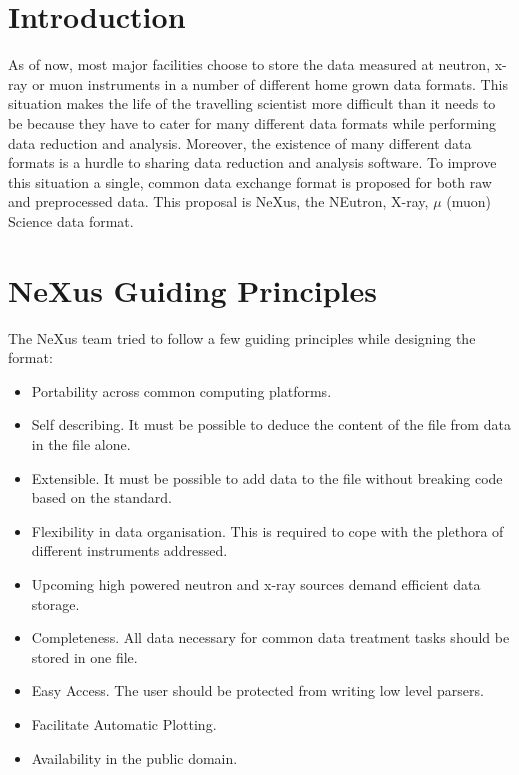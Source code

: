 %
%
%
% 
%
\section{Introduction}
As of now, most major facilities choose to store the data measured at 
 neutron, x-ray or muon instruments in a number of different home
 grown data formats. This situation makes the life of the travelling
 scientist more difficult than it needs to be because they have to
 cater for many different data formats while performing data reduction
 and analysis. Moreover, the existence of many different data formats
 is a hurdle to sharing data reduction and analysis software. To
 improve this situation a single, common data exchange format is 
 proposed for both raw and preprocessed data. This
 proposal is NeXus, the NEutron, X-ray, $\mu$ (muon) Science data format.    

\section{NeXus Guiding Principles}
The NeXus team tried to follow a few guiding principles while
designing the format:
\begin{itemize}
\item Portability across common computing platforms. 
\item Self describing. It must be possible to deduce the content of
  the file from data in the file alone.
\item Extensible. It must be possible to add data to the file without
  breaking code based on the standard. 
\item Flexibility in data organisation. This is required to cope with the
  plethora of different instruments addressed.
\item Upcoming high powered neutron and x-ray sources demand efficient
  data storage.  
\item Completeness. All data necessary for common data treatment tasks 
  should be stored in one file. 
\item Easy Access. The user should be protected from writing low level
  parsers.
\item Facilitate Automatic Plotting. 
\item Availability in the public domain. 
\end{itemize}

